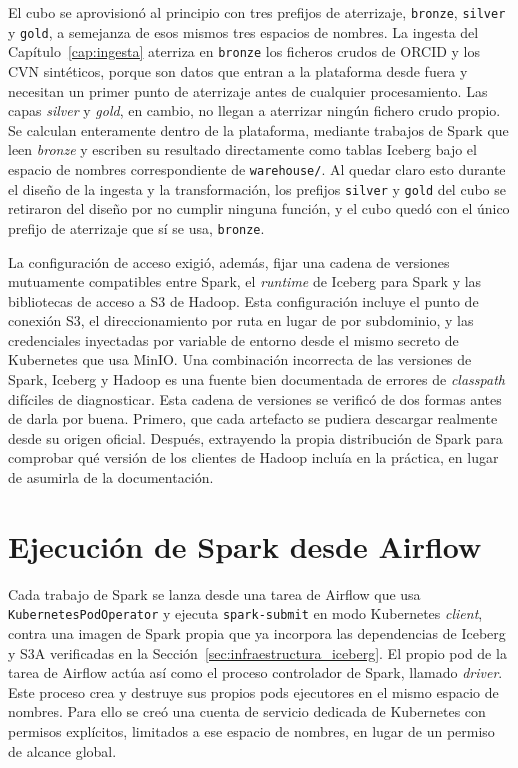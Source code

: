 El cubo se aprovisionó al principio con tres prefijos de aterrizaje,
\texttt{bronze}, \texttt{silver} y \texttt{gold}, a semejanza de esos
mismos tres espacios de nombres. La ingesta del
Capítulo~\ref{cap:ingesta} aterriza en \texttt{bronze} los ficheros crudos
de ORCID y los CVN sintéticos, porque son datos que entran a la
plataforma desde fuera y necesitan un primer punto de aterrizaje antes de
cualquier procesamiento. Las capas \textit{silver} y \textit{gold}, en
cambio, no llegan a aterrizar ningún fichero crudo propio. Se calculan
enteramente dentro de la plataforma, mediante trabajos de Spark que leen
\textit{bronze} y escriben su resultado directamente como tablas Iceberg
bajo el espacio de nombres correspondiente de \texttt{warehouse/}. Al
quedar claro esto durante el diseño de la ingesta y la transformación, los
prefijos \texttt{silver} y \texttt{gold} del cubo se retiraron del diseño
por no cumplir ninguna función, y el cubo quedó con el único prefijo de
aterrizaje que sí se usa, \texttt{bronze}.

La configuración de acceso exigió, además, fijar una cadena de versiones
mutuamente compatibles entre Spark, el \textit{runtime} de Iceberg para
Spark y las bibliotecas de acceso a S3 de Hadoop. Esta configuración
incluye el punto de conexión S3, el direccionamiento por ruta en lugar de
por subdominio, y las credenciales inyectadas por variable de entorno
desde el mismo secreto de Kubernetes que usa MinIO. Una combinación
incorrecta de las versiones de Spark, Iceberg y Hadoop es una fuente bien
documentada de errores de \textit{classpath} difíciles de diagnosticar.
Esta cadena de versiones se verificó de dos formas antes de darla por
buena. Primero, que cada artefacto se pudiera descargar realmente desde su
origen oficial. Después, extrayendo la propia distribución de Spark para
comprobar qué versión de los clientes de Hadoop incluía en la práctica, en
lugar de asumirla de la documentación.

\section{Ejecución de Spark desde Airflow}
\label{sec:infraestructura_spark}

Cada trabajo de Spark se lanza desde una tarea de Airflow que usa
\texttt{KubernetesPodOperator} y ejecuta \texttt{spark-submit} en modo
Kubernetes \textit{client}, contra una imagen de Spark propia que ya
incorpora las dependencias de Iceberg y S3A verificadas en la
Sección~\ref{sec:infraestructura_iceberg}. El propio pod de la tarea de
Airflow actúa así como el proceso controlador de Spark, llamado
\textit{driver}. Este proceso crea y destruye sus propios pods ejecutores
en el mismo espacio de nombres. Para ello se creó una cuenta de servicio
dedicada de Kubernetes con permisos explícitos, limitados a ese espacio de
nombres, en lugar de un permiso de alcance global.


